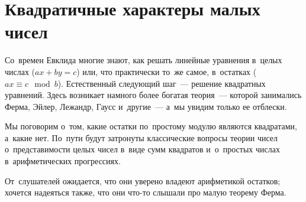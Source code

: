 
\section*{Квадратичные характеры малых чисел}



Со~времен Евклида многие знают, как решать линейные уравнения в~целых числах
($a x + b y = c$) или, что практически то~же самое, в~остатках
($a x \equiv c \mod{b}$).
Естественный следующий шаг~--- решение квадратных уравнений.
Здесь возникает намного более богатая теория~--- которой занимались Ферма,
Эйлер, Лежандр, Гаусс и~другие~--- а~мы увидим только ее отблески.

Мы поговорим о~том, какие остатки по~простому модулю являются квадратами,
а~какие нет.
По~пути будут затронуты классические вопросы теории чисел о~представимости
целых чисел в~виде сумм квадратов и~о~простых числах в~арифметических
прогрессиях.

От~слушателей ожидается, что они уверено владеют арифметикой остатков;
хочется надеяться также, что они что-то слышали про малую теорему Ферма.

